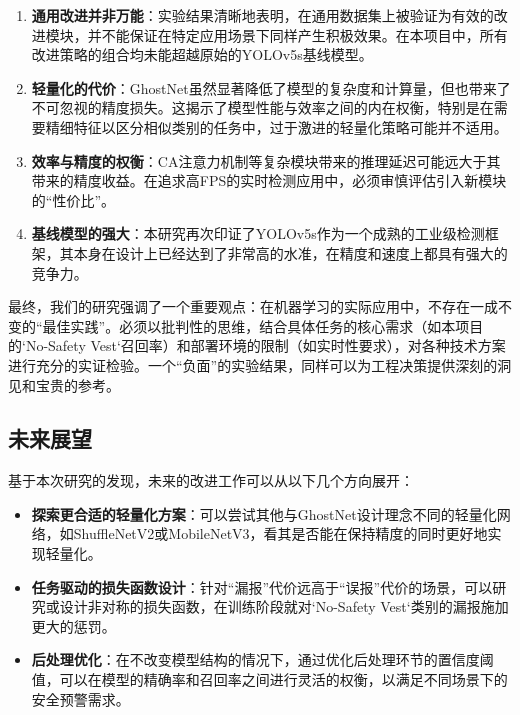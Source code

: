 \documentclass[a4paper]{ctexart}
\begin{document}
\begin{enumerate}
    \item \textbf{通用改进并非万能}：实验结果清晰地表明，在通用数据集上被验证为有效的改进模块，并不能保证在特定应用场景下同样产生积极效果。在本项目中，所有改进策略的组合均未能超越原始的YOLOv5s基线模型。
    \item \textbf{轻量化的代价}：GhostNet虽然显著降低了模型的复杂度和计算量，但也带来了不可忽视的精度损失。这揭示了模型性能与效率之间的内在权衡，特别是在需要精细特征以区分相似类别的任务中，过于激进的轻量化策略可能并不适用。
    \item \textbf{效率与精度的权衡}：CA注意力机制等复杂模块带来的推理延迟可能远大于其带来的精度收益。在追求高FPS的实时检测应用中，必须审慎评估引入新模块的“性价比”。
    \item \textbf{基线模型的强大}：本研究再次印证了YOLOv5s作为一个成熟的工业级检测框架，其本身在设计上已经达到了非常高的水准，在精度和速度上都具有强大的竞争力。
\end{enumerate}

最终，我们的研究强调了一个重要观点：在机器学习的实际应用中，不存在一成不变的“最佳实践”。必须以批判性的思维，结合具体任务的核心需求（如本项目的`No-Safety Vest`召回率）和部署环境的限制（如实时性要求），对各种技术方案进行充分的实证检验。一个“负面”的实验结果，同样可以为工程决策提供深刻的洞见和宝贵的参考。

\subsection{未来展望}
基于本次研究的发现，未来的改进工作可以从以下几个方向展开：
\begin{itemize}
    \item \textbf{探索更合适的轻量化方案}：可以尝试其他与GhostNet设计理念不同的轻量化网络，如ShuffleNetV2或MobileNetV3，看其是否能在保持精度的同时更好地实现轻量化。
    \item \textbf{任务驱动的损失函数设计}：针对“漏报”代价远高于“误报”代价的场景，可以研究或设计非对称的损失函数，在训练阶段就对`No-Safety Vest`类别的漏报施加更大的惩罚。
    \item \textbf{后处理优化}：在不改变模型结构的情况下，通过优化后处理环节的置信度阈值，可以在模型的精确率和召回率之间进行灵活的权衡，以满足不同场景下的安全预警需求。
\end{itemize}
\end{document}
